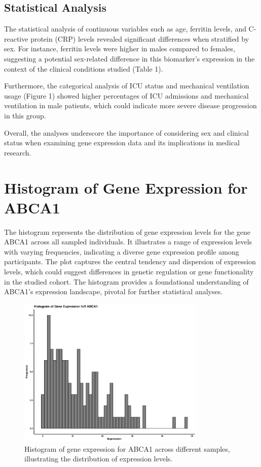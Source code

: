 \documentclass{article}
\begin{document}
\subsection{Statistical Analysis}

The statistical analysis of continuous variables such as age, ferritin levels, and C-reactive protein (CRP) levels revealed significant differences when stratified by sex. For instance, ferritin levels were higher in males compared to females, suggesting a potential sex-related difference in this biomarker's expression in the context of the clinical conditions studied (Table 1).

Furthermore, the categorical analysis of ICU status and mechanical ventilation usage (Figure 1) showed higher percentages of ICU admissions and mechanical ventilation in male patients, which could indicate more severe disease progression in this group.


Overall, the analyses underscore the importance of considering sex and clinical status when examining gene expression data and its implications in medical research.
\newpage
\section{Histogram of Gene Expression for ABCA1}
The histogram represents the distribution of gene expression levels for the gene ABCA1 across all sampled individuals. It illustrates a range of expression levels with varying frequencies, indicating a diverse gene expression profile among participants. The plot captures the central tendency and dispersion of expression levels, which could suggest differences in genetic regulation or gene functionality in the studied cohort. The histogram provides a foundational understanding of ABCA1's expression landscape, pivotal for further statistical analyses.

\begin{figure}[H]
\centering
\includegraphics[width=0.8\textwidth]{histogram_abca1.png}
\caption{Histogram of gene expression for ABCA1 across different samples, illustrating the distribution of expression levels.}
\end{figure}
\newpage
\end{document}
